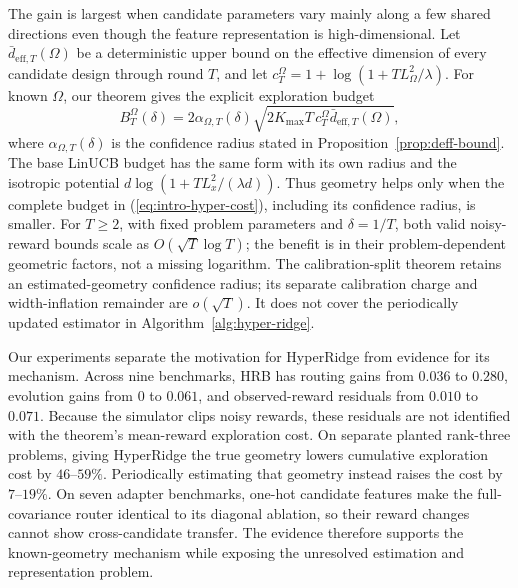 \documentclass{article} %
\renewcommand{\eqref}[1]{\textup{(\ref{#1})}}
\begin{document}
The gain is largest when candidate parameters vary mainly along a few shared directions even though the feature representation is high-dimensional. Let $\bar d_{\mathrm{eff},T}(\Omega)$ be a deterministic upper bound on the effective dimension of every candidate design through round $T$, and let $c_T^\Omega=1+\log(1+TL_\Omega^2/\lambda)$. For known $\Omega$, our theorem gives the explicit exploration budget
\begin{equation}
\label{eq:intro-hyper-cost}
B_T^\Omega(\delta)
=
2\alpha_{\Omega,T}(\delta)
\sqrt{2K_{\max}T\,c_T^\Omega\bar d_{\mathrm{eff},T}(\Omega)},
\end{equation}
where $\alpha_{\Omega,T}(\delta)$ is the confidence radius stated in Proposition~\ref{prop:deff-bound}. The base LinUCB budget has the same form with its own radius and the isotropic potential $d\log(1+TL_x^2/(\lambda d))$. Thus geometry helps only when the complete budget in \eqref{eq:intro-hyper-cost}, including its confidence radius, is smaller. For $T\ge2$, with fixed problem parameters and $\delta=1/T$, both valid noisy-reward bounds scale as $O(\sqrt{T}\log T)$; the benefit is in their problem-dependent geometric factors, not a missing logarithm. The calibration-split theorem retains an estimated-geometry confidence radius; its separate calibration charge and width-inflation remainder are $o(\sqrt{T})$. It does not cover the periodically updated estimator in Algorithm~\ref{alg:hyper-ridge}.

Our experiments separate the motivation for HyperRidge from evidence for its mechanism. Across nine benchmarks, HRB has routing gains from $0.036$ to $0.280$, evolution gains from $0$ to $0.061$, and observed-reward residuals from $0.010$ to $0.071$. Because the simulator clips noisy rewards, these residuals are not identified with the theorem's mean-reward exploration cost. On separate planted rank-three problems, giving HyperRidge the true geometry lowers cumulative exploration cost by $46$--$59\%$. Periodically estimating that geometry instead raises the cost by $7$--$19\%$. On seven adapter benchmarks, one-hot candidate features make the full-covariance router identical to its diagonal ablation, so their reward changes cannot show cross-candidate transfer. The evidence therefore supports the known-geometry mechanism while exposing the unresolved estimation and representation problem.
\end{document}
